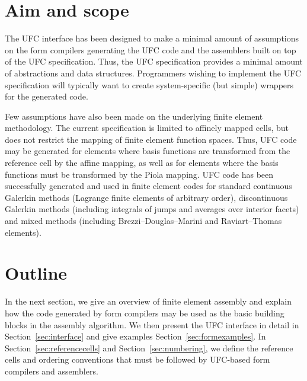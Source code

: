 \section{Aim and scope}

The UFC interface has been designed to make a minimal amount of
assumptions on the form compilers generating the UFC code and the
assemblers built on top of the UFC specification. Thus, the UFC
specification provides a minimal amount of abstractions and data
structures. Programmers wishing to implement the UFC specification
will typically want to create system-specific (but simple) wrappers
for the generated code.

Few assumptions have also been made on the underlying finite element
methodology. The current specification is limited to affinely mapped
cells, but does not restrict the mapping of finite element function
spaces. Thus, UFC code may be generated for elements where basis
functions are transformed from the reference cell by the affine
mapping, as well as for elements where the basis functions must be
transformed by the Piola mapping. UFC code has been successfully
generated and used in finite element codes for standard continuous
Galerkin methods (Lagrange finite elements of arbitrary order),
discontinuous Galerkin methods (including integrals of jumps and
averages over interior facets) and mixed methods (including
Brezzi--Douglas--Marini and Raviart--Thomas elements).

\section{Outline}

In the next section, we give an overview of finite element assembly
and explain how the code generated by form compilers may be used as
the basic building blocks in the assembly algorithm. We then present
the UFC interface in detail in Section~\ref{sec:interface} and give
examples Section~\ref{sec:formexamples}. In
Section~\ref{sec:referencecells} and Section~\ref{sec:numbering}, we
define the reference cells and ordering conventions that must be
followed by UFC-based form compilers and assemblers.
